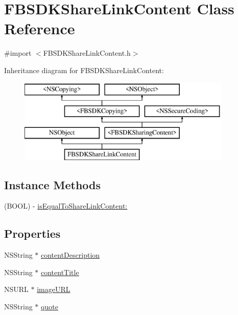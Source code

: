 \hypertarget{interface_f_b_s_d_k_share_link_content}{}\section{F\+B\+S\+D\+K\+Share\+Link\+Content Class Reference}
\label{interface_f_b_s_d_k_share_link_content}


{\ttfamily \#import $<$F\+B\+S\+D\+K\+Share\+Link\+Content.\+h$>$}

Inheritance diagram for F\+B\+S\+D\+K\+Share\+Link\+Content\+:\begin{figure}[H]
\begin{center}
\leavevmode
\includegraphics[height=4.000000cm]{interface_f_b_s_d_k_share_link_content}
\end{center}
\end{figure}
\subsection*{Instance Methods}
\begin{DoxyCompactItemize}
\item 
(B\+O\+O\+L) -\/ \hyperlink{interface_f_b_s_d_k_share_link_content_a8f34990c56f670c00c01a4a92c09b35c}{is\+Equal\+To\+Share\+Link\+Content\+:}
\end{DoxyCompactItemize}
\subsection*{Properties}
\begin{DoxyCompactItemize}
\item 
N\+S\+String $\ast$ \hyperlink{interface_f_b_s_d_k_share_link_content_a1fef92d83f1e0a9f51c0923fd820ec41}{content\+Description}
\item 
N\+S\+String $\ast$ \hyperlink{interface_f_b_s_d_k_share_link_content_acad99ec961a251713ec7118356ed6a2a}{content\+Title}
\item 
N\+S\+U\+R\+L $\ast$ \hyperlink{interface_f_b_s_d_k_share_link_content_a7eb946e85589c6436ed65bf8f4166172}{image\+U\+R\+L}
\item 
N\+S\+String $\ast$ \hyperlink{interface_f_b_s_d_k_share_link_content_af2f0d6871f79841514d9631ef65af673}{quote}
\end{DoxyCompactItemize}



